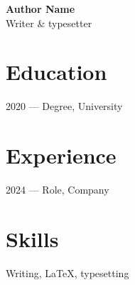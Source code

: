 \documentclass[11pt]{article}
\begin{document}
{\Large\bfseries Author Name}\\[4pt]
{\large Writer & typesetter}

\vspace{8pt}

\section*{Education}
2020 — Degree, University

\section*{Experience}
2024 — Role, Company

\section*{Skills}
Writing, LaTeX, typesetting
\end{document}
